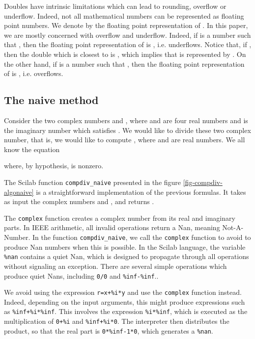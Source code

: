 \documentclass{paper}
\newcommand{\scifun}[1]{\texttt{#1}}
\newcommand{\scivar}[1]{\texttt{#1}}
\begin{document}
Doubles have intrinsic limitations which can lead to 
rounding, overflow or underflow. 
Indeed, not all mathematical numbers  
can be represented as floating point numbers. 
We denote by  the floating point representation of . 
In this paper, we are mostly concerned with overflow and 
underflow. 
Indeed, if  is a number such that , 
then the floating point representation of  is 
, i.e.  underflows. 
Notice that, if , then 
the double which is closest to  is , which implies 
that  is represented by . 
On the other hand, if  is a number such that , 
then the floating point representation of  is 
, i.e.  overflows.


\subsection{The naive method}

Consider the two complex numbers  and , where 
 and  are four real numbers and  is 
the imaginary number which satisfies . 
We would like to divide these two complex number, 
that is, we would like to compute , 
where  and  are real numbers.
We all know the equation

where, by hypothesis,  is nonzero.

The Scilab function \scifun{compdiv\_naive} presented in the figure \ref{fig-compdiv-algonaive} 
is a straightforward implementation of the previous formulas. 
It takes as input the complex numbers  and , 
and returns .

The \scifun{complex} function creates a complex number from its 
real and imaginary parts. 
In IEEE arithmetic, all invalid operations return a Nan, meaning Not-A-Number. 
In the function \scifun{compdiv\_naive}, we call the \scifun{complex} function 
to avoid to produce Nan numbers when this is possible.
In the Scilab language, the variable \scivar{\%nan} contains a quiet Nan, 
which is designed to propagate through all operations without 
signaling an exception. 
There are several simple operations which produce 
quiet Nans, including \scivar{0/0} and \scivar{\%inf-\%inf}.. 

We avoid using the expression \scivar{r=x+\%i*y} and 
use the \scifun{complex} function instead. 
Indeed, depending on the input arguments, this might produce expressions 
such as \scivar{\%inf+\%i*\%inf}.
This involves the expression \scivar{\%i*\%inf}, 
which is executed as the multiplication of 
\scivar{0+\%i} and \scivar{\%inf+\%i*0}. 
The interpreter then distributes the product, so that the real part is 
\scivar{0*\%inf-1*0}, which generates a \scivar{\%nan}.
\end{document}
